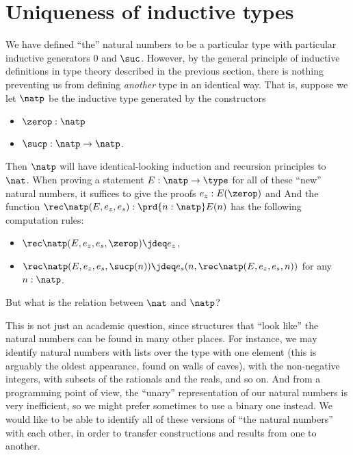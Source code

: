 %
%


\section{Uniqueness of inductive types}
\label{sec:appetizer-univalence}

%
We have defined ``the'' natural numbers to be a particular type \nat with particular inductive generators $0$ and $\suc$.
However, by the general principle of inductive definitions in type theory described in the previous section, there is nothing preventing us from defining \emph{another} type in an identical way.
That is, suppose we let $\natp$ be the inductive type generated by the constructors
\begin{itemize}
\item $\zerop:\natp$
\item $\sucp:\natp\to\natp$.
\end{itemize}
Then $\natp$ will have identical-looking induction and recursion principles to $\nat$.
When proving a statement $E : \natp \to \type$ for all of these ``new'' natural numbers, it suffices to give the proofs $e_z : E(\zerop)$ and 
And the function $\rec\natp(E,e_z,e_s) : \prd{n:\natp} E(n)$ has the following computation rules:
\begin{itemize}
\item $\rec\natp(E,e_z,e_s,\zerop) \jdeq e_z$,
\item $\rec\natp(E,e_z,e_s,\sucp(n)) \jdeq e_s(n,\rec\natp(E,e_z,e_s,n))$ for any $n : \natp$.
\end{itemize}
But what is the relation between $\nat$ and $\natp$?

This is not just an academic question, since structures that ``look like'' the natural numbers can be found in many other places.
%
For instance, we may identify natural numbers with lists over the type with one element (this is arguably the oldest appearance, found on walls of caves), with the non-negative integers, with subsets of the rationals and the reals, and so on.
And from a programming point of view, the ``unary'' representation of our natural numbers is very inefficient, so we might prefer sometimes to use a binary one instead.
We would like to be able to identify all of these versions of ``the natural numbers'' with each other, in order to transfer constructions and results from one to another.

